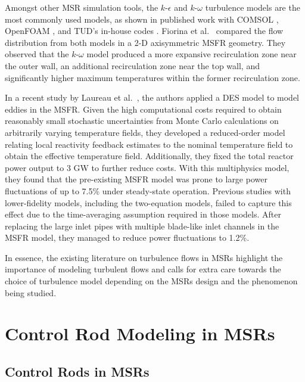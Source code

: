 Amongst other \gls{MSR} simulation tools, the $k$-$\epsilon$ and $k$-$\omega$
turbulence models are the most commonly used models, as shown in published work
with COMSOL \cite{fiorina_modelling_2014}, OpenFOAM
\cite{aufiero_development_2014}, and \gls{TUD}'s in-house codes
\cite{fiorina_modelling_2014,tiberga_results_2020}. Fiorina et al.\
\cite{fiorina_modelling_2014} compared the flow distribution from both models
in a 2-D axisymmetric \gls{MSFR} geometry. They observed that the $k$-$\omega$
model produced a more expansive recirculation zone near the outer wall, an additional
recirculation zone near the top wall, and significantly higher maximum
temperatures within the former recirculation zone.

In a recent study by
Laureau et al.\ \cite{laureau_unmoderated_2022}, the authors applied a \gls{DES} model to model
eddies in the \gls{MSFR}. Given the high computational costs required to obtain reasonably small
stochastic uncertainties from Monte Carlo calculations on arbitrarily varying temperature fields,
they developed a reduced-order model relating local reactivity feedback estimates to the nominal
temperature field to obtain the effective temperature field.
Additionally, they fixed the total
reactor power output to 3 GW to further reduce costs. With this multiphysics model, they found
that the pre-existing \gls{MSFR} model was prone to large power fluctuations of up to 7.5\% under
steady-state operation. Previous studies with lower-fidelity models, including the two-equation
models, failed to capture this effect due to the time-averaging assumption required in those
models. After replacing the large inlet pipes with multiple blade-like inlet channels in the
\gls{MSFR} model, they managed to reduce power fluctuations to 1.2\%.

In essence, the existing literature on turbulence flows in \glspl{MSR} highlight
the importance of modeling turbulent flows and calls for extra care towards the choice of
turbulence model depending on the \glspl{MSR} design and the phenomenon being studied.

\section{Control Rod Modeling in MSRs}

\subsection{Control Rods in MSRs}

